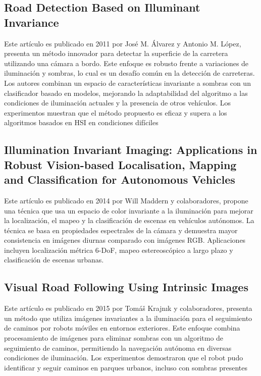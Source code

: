 \subsection{Road Detection Based on Illuminant Invariance \cite{alvarez2011}}\label{alvarez-1}

Este artículo es publicado en 2011 por José M. Álvarez y Antonio M. López, presenta un método innovador para detectar la superficie de la carretera utilizando una cámara a bordo. Este enfoque es robusto frente a variaciones de iluminación y sombras, lo cual es un desafío común en la detección de carreteras. Los autores combinan un espacio de características invariante a sombras con un clasificador basado en modelos, mejorando la adaptabilidad del algoritmo a las condiciones de iluminación actuales y la presencia de otros vehículos. Los experimentos muestran que el método propuesto es eficaz y supera a los algoritmos basados en HSI en condiciones difíciles

\subsection{Illumination Invariant Imaging: Applications in Robust Vision-based Localisation, Mapping and Classification for Autonomous Vehicles \cite{maddern2014}}\label{maddern-1}

Este artículo es publicado en 2014 por Will Maddern y colaboradores, propone una técnica que usa un espacio de color invariante a la iluminación para mejorar la localización, el mapeo y la clasificación de escenas en vehículos autónomos. La técnica se basa en propiedades espectrales de la cámara y demuestra mayor consistencia en imágenes diurnas comparado con imágenes RGB. Aplicaciones incluyen localización métrica 6-DoF, mapeo estereoscópico a largo plazo y clasificación de escenas urbanas.

\subsection{Visual Road Following Using Intrinsic Images \cite{krajník2015}}\label{krajnik-1}

Este artículo es publicado en 2015 por Tomáš Krajnık y colaboradores, presenta un método que utiliza imágenes invariantes a la iluminación para el seguimiento de caminos por robots móviles en entornos exteriores. Este enfoque combina procesamiento de imágenes para eliminar sombras con un algoritmo de seguimiento de caminos, permitiendo la navegación autónoma en diversas condiciones de iluminación. Los experimentos demostraron que el robot pudo identificar y seguir caminos en parques urbanos, incluso con sombras presentes

